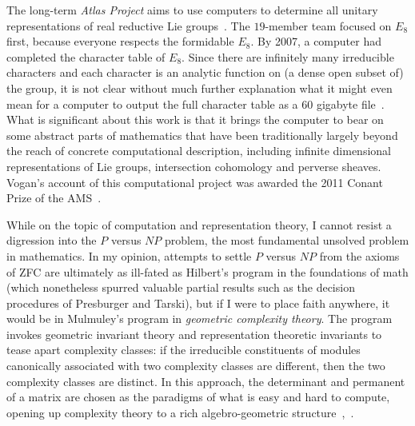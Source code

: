 \documentclass{llncs}
\begin{document}
The long-term {\it Atlas Project} aims to use computers to determine
all unitary representations of real reductive Lie groups~\cite{Atlas}.
The $19$-member team focused on $E_8$ first, because everyone respects
the formidable $E_8$.  By 2007, a computer had completed the character
table of $E_8$.  Since there are infinitely many irreducible
characters and each character is an analytic function on (a dense open
subset of) the group, it is not clear without much further explanation
what it might even mean for a computer to output the full character
table as a $60$ gigabyte file~\cite{AdChar}.  What is significant
about this work is that it brings the computer to bear on some
abstract parts of mathematics that have been traditionally largely
beyond the reach of concrete computational description, including
infinite dimensional representations of Lie groups, intersection
cohomology and perverse sheaves.  Vogan's account of this
computational project was awarded the 2011 Conant Prize of the
AMS~\cite{VE8}.




While on the topic of computation and representation theory, I cannot
resist a digression into the $P$ versus $NP$ problem, the most
fundamental unsolved problem in mathematics. In my opinion, attempts
to settle $P$ versus $NP$ from the axioms of ZFC are ultimately as
ill-fated as Hilbert's program in the foundations of math (which
nonetheless spurred valuable partial results such as the decision
procedures of Presburger and Tarski), but if I were to place faith
anywhere, it would be in Mulmuley's program in {\it geometric
  complexity theory}.  The program invokes geometric invariant theory
and representation theoretic invariants to tease apart complexity
classes: if the irreducible constituents of modules canonically
associated with two complexity classes are different, then the two
complexity classes are distinct.  In this approach, the determinant
and permanent of a matrix are chosen as the paradigms of what is easy
and hard to compute, opening up complexity theory to a rich
algebro-geometric structure~\cite{Mul11},~\cite{FPNP}.
\end{document}
